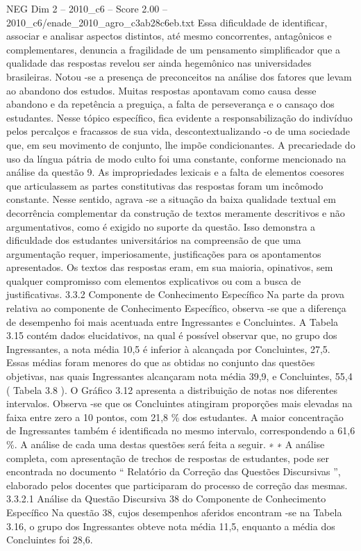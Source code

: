 \begin{textsample}{NEG Dim 2 – 2010\_c6 – Score 2.00 – 2010\_c6/enade\_2010\_agro\_c3ab28c6eb.txt}
Essa dificuldade de identificar, associar e analisar aspectos distintos, até mesmo concorrentes, antagônicos e complementares, denuncia a fragilidade de um pensamento simplificador que a qualidade das respostas revelou ser ainda hegemônico nas universidades brasileiras.
Notou -se a presença de preconceitos na análise dos fatores que levam ao abandono dos estudos.
Muitas respostas apontavam como causa desse abandono e da repetência a preguiça, a falta de perseverança e o cansaço dos estudantes.
Nesse tópico específico, fica evidente a responsabilização do indivíduo pelos percalços e fracassos de sua vida, descontextualizando -o de uma sociedade que, em seu movimento de conjunto, lhe impõe condicionantes.
A precariedade do uso da língua pátria de modo culto foi uma constante, conforme mencionado na análise da questão 9.
As impropriedades lexicais e a falta de elementos coesores que articulassem as partes constitutivas das respostas foram um incômodo constante.
Nesse sentido, agrava -se a situação da baixa qualidade textual em decorrência complementar da construção de textos meramente descritivos e não argumentativos, como é exigido no suporte da questão.
Isso demonstra a dificuldade dos estudantes universitários na compreensão de que uma argumentação requer, imperiosamente, justificações para os apontamentos apresentados.
Os textos das respostas eram, em sua maioria, opinativos, sem qualquer compromisso com elementos explicativos ou com a busca de justificativas. 3.3.2 Componente de Conhecimento Específico Na parte da prova relativa ao componente de Conhecimento Específico, observa -se que a diferença de desempenho foi mais acentuada entre Ingressantes e Concluintes.
A Tabela 3.15 contém dados elucidativos, na qual é possível observar que, no grupo dos Ingressantes, a nota média 10,5 é inferior à alcançada por Concluintes, 27,5.
Essas médias foram menores do que as obtidas no conjunto das questões objetivas, nas quais Ingressantes alcançaram nota média 39,9, e Concluintes, 55,4 ( Tabela 3.8 ).
O Gráfico 3.12 apresenta a distribuição de notas nos diferentes intervalos.
Observa -se que os Concluintes atingiram proporções mais elevadas na faixa entre zero a 10 pontos, com 21,8 \% dos estudantes.
A maior concentração de Ingressantes também é identificada no mesmo intervalo, correspondendo a 61,6 \%.
A análise de cada uma destas questões será feita a seguir. ∗ ∗ A análise completa, com apresentação de trechos de respostas de estudantes, pode ser encontrada no documento “ Relatório da Correção das Questões Discursivas ”, elaborado pelos docentes que participaram do processo de correção das mesmas. 3.3.2.1 Análise da Questão Discursiva 38 do Componente de Conhecimento Específico Na questão 38, cujos desempenhos aferidos encontram -se na Tabela 3.16, o grupo dos Ingressantes obteve nota média 11,5, enquanto a média dos Concluintes foi 28,6.

\end{textsample}
